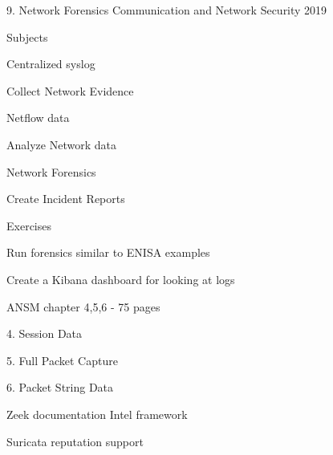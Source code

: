 \documentclass[Screen16to9,17pt]{foils}
\begin{document}
\mytitlepage
{9. Network Forensics}
{Communication and Network Security 2019}


\begin{list1}
\item Subjects
\begin{list2}
\item Centralized syslog
\item Collect Network Evidence
\item Netflow data
\item Analyze Network data
\item Network Forensics
\item Create Incident Reports
\end{list2}
\item Exercises
\begin{list2}
\item Run forensics similar to ENISA examples
\item Create a Kibana dashboard for looking at logs

\end{list2}
\end{list1}


\begin{list1}
\item ANSM chapter 4,5,6 - 75 pages
\item 4. Session Data
\item 5. Full Packet Capture
\item 6. Packet String Data
\end{list1}


\begin{list1}
\item Zeek documentation Intel framework
\\
\item Suricata reputation support\\
\end{list1}

\end{document}

